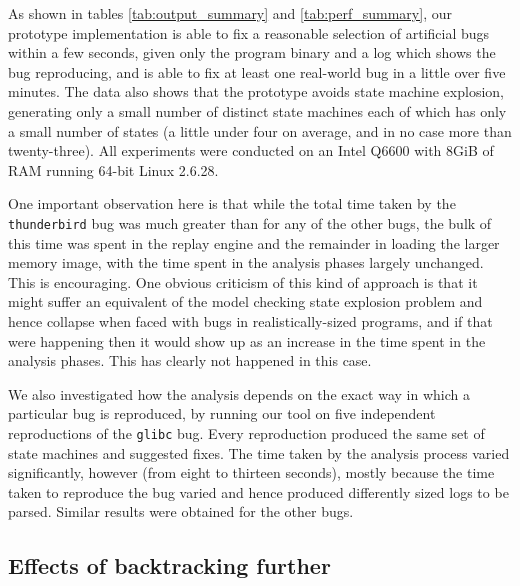 \documentclass[10pt,letter,twocolumn]{sigplanconf}
\newcommand{\editorial}[1]{}
\begin{document}
As shown in tables \ref{tab:output_summary} and
\ref{tab:perf_summary}, our prototype implementation is able to fix a
reasonable selection of artificial bugs within a few seconds, given
only the program binary and a log which shows the bug reproducing, and
is able to fix at least one real-world bug in a little over five
minutes.  The data also shows that the prototype avoids state machine
explosion, generating only a small number of distinct state machines
each of which has only a small number of states (a little under four
on average, and in no case more than twenty-three).  All experiments
were conducted on an Intel Q6600 with 8GiB of RAM running 64-bit Linux
2.6.28.

One important observation here is that while the total time taken by
the \verb|thunderbird| bug was much greater than for any of the other
bugs, the bulk of this time was spent in the replay engine and the
remainder in loading the larger memory image, with the time spent in
the analysis phases largely unchanged.  This is encouraging.  One
obvious criticism of this kind of approach is that it might suffer an
equivalent of the model checking state explosion problem and hence
collapse when faced with bugs in realistically-sized programs, and if
that were happening then it would show up as an increase in the time
spent in the analysis phases.  This has clearly not happened in this
case.

We also investigated how the analysis depends on the exact way in 
which a particular bug is reproduced, by running our tool
on five independent reproductions of the \verb|glibc| bug.  Every
reproduction produced the same set of state machines and suggested
fixes.  The time taken by the analysis process varied significantly,
however (from eight to thirteen seconds), mostly because the time
taken to reproduce the bug varied and hence produced differently sized
logs to be parsed. Similar results were obtained for the other
bugs.\editorial{Not sure this is all that interesting, or that I've
  phrased it very well...}

\subsection{Effects of backtracking further}
\label{sect:eval:backtrack}
\end{document}

